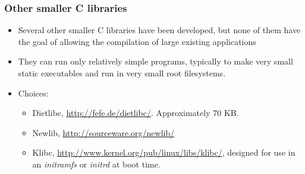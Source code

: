 \begin{frame}
  \frametitle{Other smaller C libraries}
  \begin{itemize}
  \item Several other smaller C libraries have been developed, but
    none of them have the goal of allowing the compilation of large
    existing applications
  \item They can run only relatively simple programs,
	typically to make very small static executables and run
	in very small root filesystems.
  \item Choices:
    \begin{itemize}
    \item Dietlibc, \url{http://fefe.de/dietlibc/}. Approximately
      70 KB.
    \item Newlib, \url{http://sourceware.org/newlib/}
    \item Klibc, \url{http://www.kernel.org/pub/linux/libs/klibc/},
      designed for use in an {\em initramfs} or {\em initrd} at boot
      time.
    \end{itemize}
  \end{itemize}
\end{frame}
